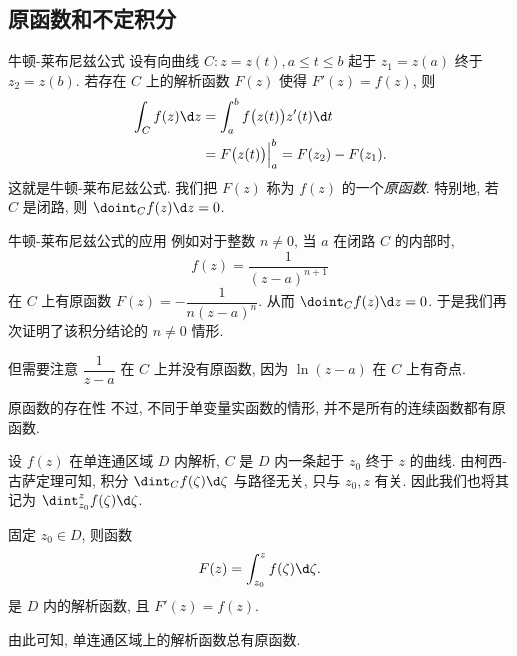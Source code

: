 \subsection{原函数和不定积分}


\begin{frame}{牛顿-莱布尼兹公式}
	\onslide<+->
	设有向曲线 $C:z=z(t),a\le t\le b$ 起于 $z_1=z(a)$ 终于 $z_2=z(b)$.
	\onslide<+->
	若存在 $C$ 上的解析函数 $F(z)$ 使得 $F'(z)=f(z)$, 则
	\begin{align*}
			\int_C f(z)\d z&
		=\int_a^b f\bigl(z(t)\bigr)z'(t)\d t\\&
		=F\bigl(z(t)\bigr)\Big|_a^b
		=F(z_2)-F(z_1).
	\end{align*}
	\onslide<+->
	这就是\alert{牛顿-莱布尼兹公式}.
	\onslide<+->
	我们把 $F(z)$ 称为 $f(z)$ 的一个\emph{原函数}.
	\onslide<+->
	特别地, 若 $C$ 是闭路, 则 $\doint_C f(z)\d z=0$.
\end{frame}


\begin{frame}{牛顿-莱布尼兹公式的应用}
	\onslide<+->
	例如对于整数 $n\neq0$, 当 $a$ 在闭路 $C$ 的内部时,
	\[
		f(z)=\dfrac1{(z-a)^{n+1}}
	\]
	在 $C$ 上有原函数 $F(z)=-\dfrac1{n(z-a)^n}$.
	\onslide<+->
	从而 $\doint_C f(z)\d z=0$. 
	\onslide<+->
	于是我们再次证明了该积分结论的 $n\neq0$ 情形.

	\onslide<+->
	但需要注意 $\dfrac1{z-a}$ 在 $C$ 上并没有原函数, 因为 $\ln(z-a)$ 在 $C$ 上有奇点.
\end{frame}


\begin{frame}{原函数的存在性}
	\onslide<+->
	不过, 不同于单变量实函数的情形, 并不是所有的连续函数都有原函数.

	\onslide<+->
	设 $f(z)$ 在单连通区域 $D$ 内解析, $C$ 是 $D$ 内一条起于 $z_0$ 终于 $z$ 的曲线.
	\onslide<+->
	由柯西-古萨定理可知, 积分 $\dint_Cf(\zeta)\d \zeta$ 与路径无关, 只与 $z_0,z$ 有关.
	\onslide<+->
	因此我们也将其记为 $\dint_{z_0}^zf(\zeta)\d\zeta$.
	\onslide<+->
	\begin{theorem}
		固定 $z_0\in D$, 则函数
		\[
			F(z)=\int_{z_0}^zf(\zeta)\d\zeta.
		\]
		是 $D$ 内的解析函数, 且 $F'(z)=f(z)$.
	\end{theorem}
	\onslide<+->
	由此可知, \alert{单连通区域上的解析函数总有原函数}.
\end{frame}



